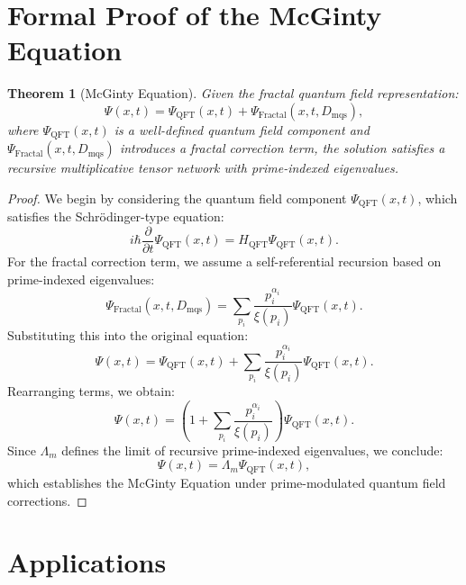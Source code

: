 \documentclass{article}
\theoremstyle{plain}
\newtheorem{theorem}{Theorem}
\begin{document}
\section{Formal Proof of the McGinty Equation}
\begin{theorem}[McGinty Equation]
Given the fractal quantum field representation:
\begin{equation}
    \Psi(x,t) = \Psi_{\text{QFT}}(x,t) + \Psi_{\text{Fractal}}(x,t,D_{\text{mqs}}),
\end{equation}
where $\Psi_{\text{QFT}}(x,t)$ is a well-defined quantum field component and $\Psi_{\text{Fractal}}(x,t,D_{\text{mqs}})$ introduces a fractal correction term, the solution satisfies a recursive multiplicative tensor network with prime-indexed eigenvalues.
\end{theorem}

\begin{proof}
We begin by considering the quantum field component $\Psi_{\text{QFT}}(x,t)$, which satisfies the Schrödinger-type equation:
\begin{equation}
    i\hbar \frac{\partial}{\partial t} \Psi_{\text{QFT}}(x,t) = H_{\text{QFT}} \Psi_{\text{QFT}}(x,t).
\end{equation}
For the fractal correction term, we assume a self-referential recursion based on prime-indexed eigenvalues:
\begin{equation}
    \Psi_{\text{Fractal}}(x,t,D_{\text{mqs}}) = \sum_{p_i} \frac{p_i^{\alpha_i}}{\xi(p_i)} \Psi_{\text{QFT}}(x,t).
\end{equation}
Substituting this into the original equation:
\begin{equation}
    \Psi(x,t) = \Psi_{\text{QFT}}(x,t) + \sum_{p_i} \frac{p_i^{\alpha_i}}{\xi(p_i)} \Psi_{\text{QFT}}(x,t).
\end{equation}
Rearranging terms, we obtain:
\begin{equation}
    \Psi(x,t) = \left(1 + \sum_{p_i} \frac{p_i^{\alpha_i}}{\xi(p_i)} \right) \Psi_{\text{QFT}}(x,t).
\end{equation}
Since $\Lambda_m$ defines the limit of recursive prime-indexed eigenvalues, we conclude:
\begin{equation}
    \Psi(x,t) = \Lambda_m \Psi_{\text{QFT}}(x,t),
\end{equation}
which establishes the McGinty Equation under prime-modulated quantum field corrections.
\end{proof}

\section{Applications}
\end{document}

